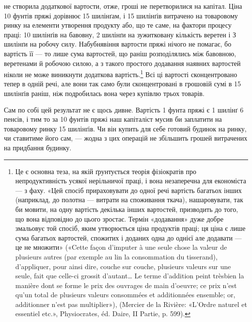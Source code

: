 \parcont{}  %
не створила додаткової вартости, отже, гроші не перетворилися
на капітал. Ціна 10 фунтів пряжі дорівнює 15 шилінґам, і 15 шилінґів
витрачено на товаровому ринку на елементи утворення
продукту або, що те саме, на фактори процесу праці: 10 шилінґів
на бавовну, 2 шилінґи на зужитковану кількість веретен і
З шилінґи на робочу силу. Набубнявіння вартости пряжі нічого
не помагає, бо вартість її — то лише сума вартостей, що раніш
розподілялись між бавовною, веретенами й робочою силою, а з
такого простого додавання наявних вартостей ніколи не може
виникнути додаткова вартість.\footnote{
Це є основна теза, на якій ґрунтується теорія фізіократів про
непродуктивність усякої нерільничої праці, і вона незаперечна для економіста
— з фаху. «Цей спосіб прираховувати до одної речі вартість багатьох
інших (наприклад, до полотна — витрати на споживання ткача), нашаровувати,
так би мовити, на одну вартість декілька інших вартостей, призводить
до того, що вона відповідно до цього зростає. Термін «додавання» дуже
добре змальовує той спосіб, яким утворюється ціна продуктів праці; ця
ціна є лише сума багатьох вартостей, спожитих і доданих одна до однієї
але додавати — це не множити» («Cette façon d’imputer à une seule chose
la valeur de plusieurs autres (par exemple au lin la consommation du tisserand),
d’appliquer, pour ainsi dire, couche sur couche, plusieurs valeurs
sur une seule, fait que celle-ci grossit d’autant\dots{} Le terme d’addition peint trèsbien
la manière dont se forme le prix des ouvrages de main d’oeuvre; ce prix
n’est qu’un total de plusieurs valeurs consommées et additionnées ensemble;
or, additionner n’est pas multiplier»), (Mercier de la Rivière: «L’Ordre naturel
et essentiel etc.», Physiocrates, éd. Daire, II Partie, p. 599).
} Всі ці вартості сконцентровано
тепер в одній речі, але вони так само були сконцентровані в грошовій
сумі в 15 шилінґів раніш, ніж подробилась вона через
купівлю трьох товарів.

Сам по собі цей результат не є щось дивне. Вартість 1 фунта
пряжі є 1 шилінґ 6 пенсів, і тим то за 10 фунтів пряжі наш капіталіст
мусив би заплатити на товаровому ринку 15 шилінґів.
Чи він купить для себе готовий будинок на ринку, чи ставитиме
його сам, — жодна з цих операцій не збільшить грошей витрачених
на придбання будинку.

